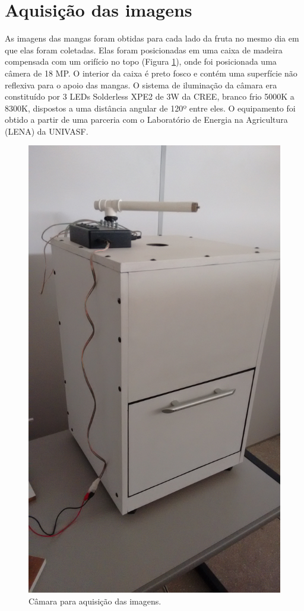 \section{Aquisição das imagens}

As imagens das mangas foram obtidas para cada lado da fruta no mesmo dia em que elas foram coletadas. Elas foram posicionadas em uma caixa de madeira compensada com um orifício no topo (Figura \ref{img:caixa}), onde foi posicionada uma câmera de 18 MP. O interior da caixa é preto fosco e contém uma superfície não reflexiva para o apoio das mangas. O sistema de iluminação da câmara era constituído por 3 LEDs Solderless XPE2 de 3W da CREE, branco frio 5000K a 8300K, dispostos a uma distância angular de 120º entre eles. O equipamento foi obtido a partir de uma parceria com o Laboratório de Energia na Agricultura (LENA) da UNIVASF. 

\begin{figure}[H]
\centering
	\caption{Câmara para aquisição das imagens.}\label{img:caixa}
	\includegraphics[scale=0.1]{img/caixa.jpg}
\end{figure}

